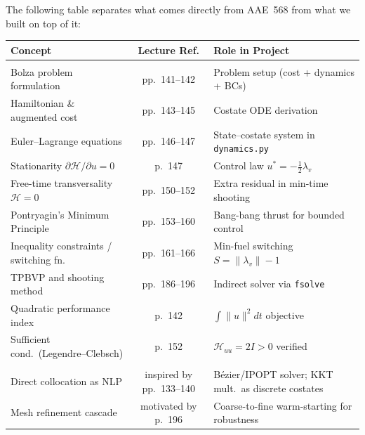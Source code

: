 \documentclass[11pt,letterpaper]{article}
\begin{document}
The following table separates what comes directly from AAE~568 from what we built on top of it:

\begin{center}
\renewcommand{\arraystretch}{1.35}
\small
\begin{tabularx}{\textwidth}{>{\raggedright\arraybackslash}X c >{\raggedright\arraybackslash}p{5.5cm}}
\toprule
\textbf{Concept} & \textbf{Lecture Ref.} & \textbf{Role in Project} \\
\midrule
\multicolumn{3}{l}{\textit{\textbf{\color{darkblue}Directly from the course}}} \\[2pt]
Bolza problem formulation          & pp.~141--142  & Problem setup (cost + dynamics + BCs) \\
Hamiltonian \& augmented cost       & pp.~143--145  & Costate ODE derivation \\
Euler--Lagrange equations            & pp.~146--147  & State--costate system in \texttt{dynamics.py} \\
Stationarity $\partial\mathcal{H}/\partial u = 0$
                                    & p.~147        & Control law $u^* = -\frac{1}{2}\lambda_v$ \\
Free-time transversality $\mathcal{H}=0$
                                    & pp.~150--152  & Extra residual in min-time shooting \\
Pontryagin's Minimum Principle      & pp.~153--160  & Bang-bang thrust for bounded control \\
Inequality constraints / switching fn.
                                    & pp.~161--166  & Min-fuel switching $S = \|\lambda_v\|-1$ \\
TPBVP and shooting method          & pp.~186--196  & Indirect solver via \texttt{fsolve} \\
Quadratic performance index         & p.~142        & $\int\|u\|^2 dt$ objective \\
Sufficient cond.\ (Legendre--Clebsch)
                                    & p.~152        & $\mathcal{H}_{uu} = 2I > 0$ verified \\[6pt]
\multicolumn{3}{l}{\textit{\textbf{\color{lightblue}Extensions beyond the course}}} \\[2pt]
Direct collocation as NLP           & inspired by pp.~133--140
                                                    & B\'ezier/IPOPT solver; KKT mult.\ as discrete costates \\
Mesh refinement cascade             & motivated by p.~196
                                                    & Coarse-to-fine warm-starting for robustness \\

\end{tabularx}
\end{center}
\end{document}
